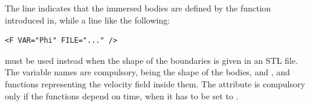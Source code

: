 The line  indicates that the immersed bodies are defined by the function introduced in, while a line like the following:

\begin{lstlisting}[style=XMLStyle]
    <F VAR="Phi" FILE="..." />
\end{lstlisting}

must be used instead when the shape of the boundaries is given in an STL file. The variable names are compulsory, being  the shape of the bodies, and ,  and  functions representing the velocity field inside them. The attribute  is compulsory only if the functions depend on time, when it has to be set to .